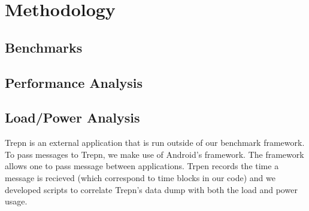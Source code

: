 \section{Methodology}

\subsection{Benchmarks}


\subsection{Performance Analysis}


\subsection{Load/Power Analysis}

Trepn is an external application that is run outside of our benchmark framework.
To pass messages to Trepn, we make use of Android's  framework.
The  framework allows one to pass message between applications.
Trpen records the time a message is recieved (which correspond to time blocks
in our code) and we developed scripts to correlate Trepn's data dump with both
the load and power usage.
